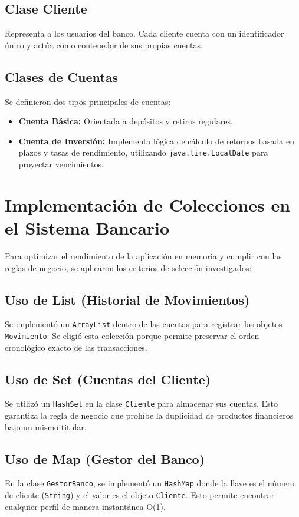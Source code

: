 \documentclass[12pt, letterpaper]{article}
\begin{document}
	\subsection{Clase Cliente}
	Representa a los usuarios del banco. Cada cliente cuenta con un identificador único y actúa como contenedor de sus propias cuentas.
	
	\subsection{Clases de Cuentas}
	Se definieron dos tipos principales de cuentas:
	\begin{itemize}
		\item \textbf{Cuenta Básica:} Orientada a depósitos y retiros regulares.
		\item \textbf{Cuenta de Inversión:} Implementa lógica de cálculo de retornos basada en plazos y tasas de rendimiento, utilizando \texttt{java.time.LocalDate} para proyectar vencimientos.
	\end{itemize}
	
	\section{Implementación de Colecciones en el Sistema Bancario}
	Para optimizar el rendimiento de la aplicación en memoria y cumplir con las reglas de negocio, se aplicaron los criterios de selección investigados:
	
	\subsection{Uso de List (Historial de Movimientos)}
	Se implementó un \texttt{ArrayList} dentro de las cuentas para registrar los objetos \texttt{Movimiento}. Se eligió esta colección porque permite preservar el orden cronológico exacto de las transacciones.
	
	\subsection{Uso de Set (Cuentas del Cliente)}
	Se utilizó un \texttt{HashSet} en la clase \texttt{Cliente} para almacenar sus cuentas. Esto garantiza la regla de negocio que prohíbe la duplicidad de productos financieros bajo un mismo titular.
	
	\subsection{Uso de Map (Gestor del Banco)}
	En la clase \texttt{GestorBanco}, se implementó un \texttt{HashMap} donde la llave es el número de cliente (\texttt{String}) y el valor es el objeto \texttt{Cliente}. Esto permite encontrar cualquier perfil de manera instantánea O(1).
	
\end{document}
